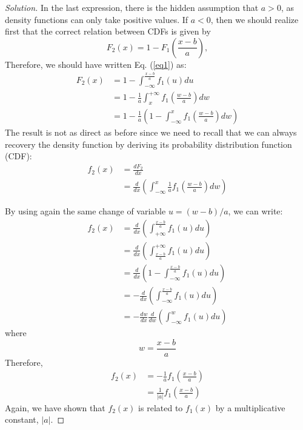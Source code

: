 \documentclass{article}
\newenvironment{solution}{\begin{proof}[Solution]}{\end{proof}}
\begin{document}
\begin{solution}
    In the last expression, there is the hidden assumption that $a > 0$, as density functions can only take positive values. If $a < 0$, then we should realize first that the correct relation between CDFs is given by
    \begin{equation}
      F_2(x) = 1 - F_1(\frac{x - b}{a}),
    \end{equation}
    Therefore, we should have written Eq. (\ref{eq1}) as:
    \begin{align}
      F_2(x) &= 1 - \int_{-\infty}^{\frac{x - b}{a}} f_1(u) du \nonumber\\
             &= 1 -  \frac{1}{a} \int_x^{+\infty} f_1\left (\frac{w - b}{a} \right) dw \nonumber\\
             &= 1 -  \frac{1}{a} ( 1 - \int_{-\infty}^{x} f_1\left (\frac{w - b}{a} \right) dw )
      \label{eq2}         
    \end{align}
    The result is not as direct as before since we need to recall that we can always recovery the density function by deriving its probability distribution function (CDF):
    \begin{align}
      f_2(x) &= \frac{dF_2}{dx} \nonumber\\
             &= \frac{d}{dx} \left(\int_{-\infty}^x \frac{1}{a} f_1\left (\frac{w - b}{a} \right) dw \right )
    \end{align}
               
    By using again the same change of variable $u = (w-b)/a$, we can write:
    \begin{align}
      f_2(x) &= \frac{d}{dx} \left(\int_{+\infty}^{\frac{x-b}{a}} f_1(u) du \right ) \nonumber \\
      &= \frac{d}{dx} \left(\int_{\frac{x-b}{a}}^{+\infty} f_1(u) du \right ) \nonumber \\
      &= \frac{d}{dx} \left(1 - \int_{-\infty}^{\frac{x-b}{a}} f_1(u) du \right ) \nonumber \\
      &=  -\frac{d}{dx} \left(\int_{-\infty}^{\frac{x-b}{a}} f_1(u) du \right) \nonumber \\
      &=  -\frac{dw}{dx} \frac{d}{dw} \left(\int_{-\infty}^{w} f_1(u) du \right)   
    \end{align}
    where $$w = \frac{x-b}{a}$$ 
    Therefore,
    \begin{align}
      f_2(x) &= -\frac{1}{a} f_1\left( \frac{x-b}{a} \right) \nonumber \\
             &=  \frac{1}{|a|} f_1\left( \frac{x-b}{a} \right)
    \end{align}
    Again, we have shown that $f_2(x)$ is related to $f_1(x)$ by a multiplicative constant, $|a|$.
      

\end{solution}
\end{document}
